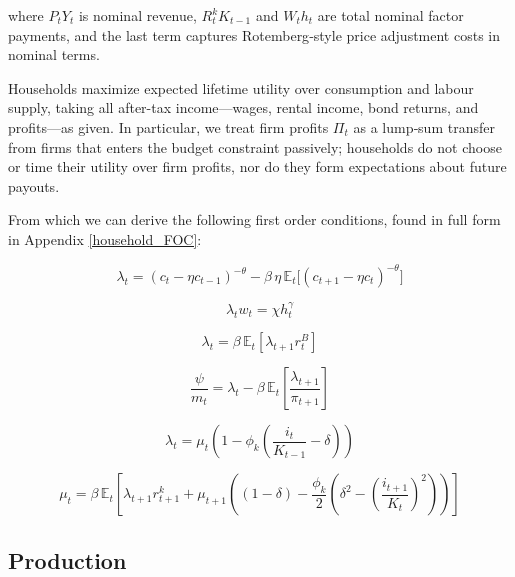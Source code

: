 \documentclass[11pt,preprint]{elsarticle}
\numberwithin{equation}{section}
\numberwithin{figure}{section}
\numberwithin{table}{section}
\begin{document}
where \(P_tY_t\) is nominal revenue, \(R^k_t K_{t-1}\) and \(W_t h_t\)
are total nominal factor payments, and the last term captures
Rotemberg‐style price adjustment costs in nominal terms.

Households maximize expected lifetime utility over consumption and
labour supply, taking all after-tax income---wages, rental income, bond
returns, and profits---as given. In particular, we treat firm profits
\(\Pi_t\) as a lump‐sum transfer from firms that enters the budget
constraint passively; households do not choose or time their utility
over firm profits, nor do they form expectations about future payouts.

From which we can derive the following first order conditions, found in
full form in Appendix \ref{household_FOC}:

\begin{equation}\label{foc_C}
\lambda_t = (c_t-\eta c_{t-1})^{-\theta} - \beta\,\eta\,\mathbb{E}_t\bigl[(c_{t+1}-\eta c_t)^{-\theta}\bigr]
\end{equation}

\begin{equation}\label{foc_h}
\lambda_t w_t = \chi h_t^{\gamma}
\end{equation}

\begin{equation}\label{foc_B}
\lambda_t = \beta \, \mathbb{E}_t \left[ \lambda_{t+1} r^B_t \right]
\end{equation}

\begin{equation}\label{foc_M}
\dfrac{\psi}{m_t} = \lambda_t - \beta \, \mathbb{E}_t \left[ \dfrac{\lambda_{t+1}}{\pi_{t+1}} \right]
\end{equation}

\begin{equation}\label{foc_I}
\lambda_t = \mu_t \left( 1 - \phi_k \left( \frac{i_t}{K_{t-1}} - \delta \right) \right)
\end{equation}

\begin{equation}\label{foc_K}
\mu_t = \beta \, \mathbb{E}_t \left[ \lambda_{t+1} r^k_{t+1} + \mu_{t+1} \left( (1-\delta) - \frac{\phi_k}{2} \left( \delta^2 - \left( \frac{i_{t+1}}{K_t} \right)^2 \right) \right) \right]
\end{equation}

\newpage

\subsection{Production}\label{production}
\end{document}
